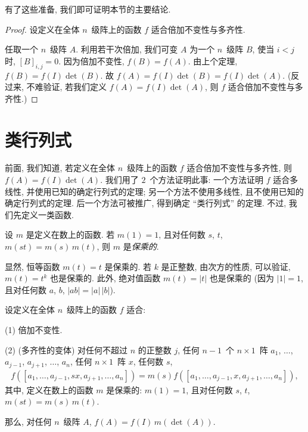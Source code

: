 \documentclass[../libro.tex]{subfiles}
\begin{document}
有了这些准备, 我们即可证明本节的主要结论.

\begin{proof}
    设定义在全体 \(n\)~级阵上的函数 \(f\)
    适合倍加不变性与多齐性.

    任取一个 \(n\)~级阵 \(A\).
    利用若干次倍加,
    我们可变 \(A\) 为一个 \(n\)~级阵 \(B\),
    使当 \(i < j\) 时, \([B]_{i,j} = 0\).
    因为倍加不变性, \(f(B) = f(A)\).
    由上个定理, \(f(B) = f(I) \det {(B)}\).
    故 \(f(A) = f(I) \det {(B)} = f(I) \det {(A)}\).
    (反过来, 不难验证, 若我们定义 %
    \(f(A) = f(I) \det {(A)}\),
    则 \(f\) 适合倍加不变性与多齐性.) %
\end{proof}

\section{类行列式}

前面, 我们知道, 若定义在全体 \(n\)~级阵上的函数 \(f\)
适合倍加不变性与多齐性,
则 \(f(A) = f(I) \det {(A)}\).
我们用了 \(2\)~个方法证明此事:
一个方法证明 \(f\) 适合多线性, 并使用已知的确定行列式的定理;
另一个方法不使用多线性, 且不使用已知的确定行列式的定理.
后一个方法可被推广, 得到确定 ``类行列式'' 的定理.
不过, 我们先定义一类函数.

\begin{definition}
    设 \(m\) 是定义在数上的函数.
    若 \(m(1) = 1\),
    且对任何数 \(s\), \(t\), \(m(st) = m(s)\, m(t)\),
    则 \(m\) 是\emph{保乘的}.
\end{definition}

显然, 恒等函数 \(m(t) = t\) 是保乘的.
若 \(k\) 是正整数,
由次方的性质, 可以验证,
\(m(t) = t^k\) 也是保乘的.
此外, 绝对值函数 \(m(t) = |t|\) 也是保乘的
(因为 \(|1| = 1\),
且对任何数 \(a\), \(b\), \(|ab| = |a|\,|b|\)).

\begin{theorem}
    设定义在全体 \(n\)~级阵上的函数 \(f\) 适合:

    (1)
    倍加不变性.

    (2)
    (多齐性的变体)
    对任何不超过 \(n\) 的正整数 \(j\),
    任何 \(n-1\)~个 \(n \times 1\)~阵
    \(a_1\), \(\dots\), \(a_{j-1}\),
    \(a_{j+1}\), \(\dots\), \(a_n\),
    任何 \(n \times 1\)~阵 \(x\),
    任何数 \(s\),
    \begin{align*}
        f([a_1, \dots, a_{j-1}, sx, a_{j+1}, \dots, a_n])
        = m(s) f([a_1, \dots, a_{j-1}, x, a_{j+1}, \dots, a_n]),
    \end{align*}
    其中, 定义在数上的函数 \(m\) 是保乘的:
    \(m(1) = 1\),
    且对任何数 \(s\), \(t\), \(m(st) = m(s)\, m(t)\).

    那么, 对任何 \(n\)~级阵 \(A\),
    \(f(A) = f(I)\, m(\det {(A)})\).
\end{theorem}
\end{document}
